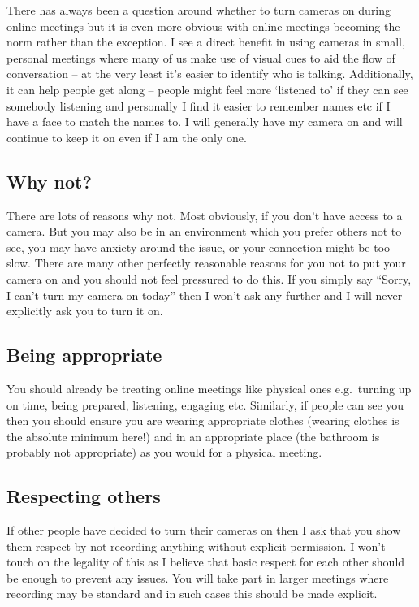 \documentclass[
]{book}
\begin{document}
There has always been a question around whether to turn cameras on during online meetings but it is even more obvious with online meetings becoming the norm rather than the exception. I see a direct benefit in using cameras in small, personal meetings where many of us make use of visual cues to aid the flow of conversation -- at the very least it's easier to identify who is talking. Additionally, it can help people get along -- people might feel more `listened to' if they can see somebody listening and personally I find it easier to remember names etc if I have a face to match the names to. I will generally have my camera on and will continue to keep it on even if I am the only one.

\hypertarget{why-not}{%
\subsection{Why not?}\label{why-not}}

There are lots of reasons why not. Most obviously, if you don't have access to a camera. But you may also be in an environment which you prefer others not to see, you may have anxiety around the issue, or your connection might be too slow. There are many other perfectly reasonable reasons for you not to put your camera on and you should not feel pressured to do this. If you simply say ``Sorry, I can't turn my camera on today'' then I won't ask any further and I will never explicitly ask you to turn it on.

\hypertarget{being-appropriate}{%
\subsection{Being appropriate}\label{being-appropriate}}

You should already be treating online meetings like physical ones e.g.~turning up on time, being prepared, listening, engaging etc. Similarly, if people can see you then you should ensure you are wearing appropriate clothes (wearing clothes is the absolute minimum here!) and in an appropriate place (the bathroom is probably not appropriate) as you would for a physical meeting.

\hypertarget{respecting-others}{%
\subsection{Respecting others}\label{respecting-others}}

If other people have decided to turn their cameras on then I ask that you show them respect by not recording anything without explicit permission. I won't touch on the legality of this as I believe that basic respect for each other should be enough to prevent any issues. You will take part in larger meetings where recording may be standard and in such cases this should be made explicit.
\end{document}
